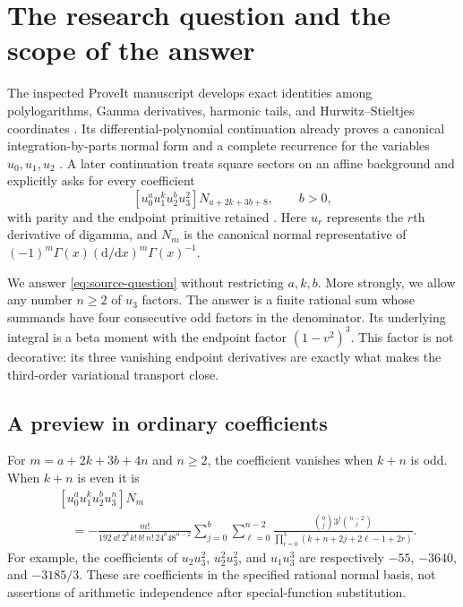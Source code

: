 \section{The research question and the scope of the answer}
\label{sec:scope}

The inspected ProveIt manuscript develops exact identities among
polylogarithms, Gamma derivatives, harmonic tails, and Hurwitz--Stieltjes
coordinates \cite{RepoMain}. Its differential-polynomial continuation
already proves a canonical integration-by-parts normal form and a complete
recurrence for the variables $u_0,u_1,u_2$ \cite{RepoQuadratic}. A later
continuation treats square sectors on an affine background and explicitly
asks for every coefficient
\begin{equation}\label{eq:source-question}
 [u_0^a u_1^k u_2^b u_3^2]N_{a+2k+3b+8},\qquad b>0,
\end{equation}
with parity and the endpoint primitive retained \cite[Question 1]{RepoQuestions}.
Here $u_r$ represents the $r$th derivative of digamma, and $N_m$ is the
canonical normal representative of
$(-1)^m\Gamma(x)(\mathrm d/\mathrm dx)^m\Gamma(x)^{-1}$.

We answer \eqref{eq:source-question} without restricting $a,k,b$. More
strongly, we allow any number $n\ge2$ of $u_3$ factors. The answer is a
finite rational sum whose summands have four consecutive odd factors in
the denominator. Its underlying integral is a beta moment with the
endpoint factor $(1-v^2)^3$. This factor is not decorative: its three
vanishing endpoint derivatives are exactly what makes the third-order
variational transport close.

\subsection{A preview in ordinary coefficients}
For $m=a+2k+3b+4n$ and $n\ge2$, the coefficient vanishes when $k+n$ is
odd. When $k+n$ is even it is
\begin{equation}\label{eq:preview}
\begin{split}
 &[u_0^a u_1^k u_2^b u_3^n]N_m\\
 &\quad=-\frac{m!}{192\,a!\,2^k k!\,b!\,n!\,24^b48^{n-2}}
 \sum_{j=0}^{b}\sum_{\ell=0}^{n-2}
 \frac{\binom bj3^j\binom{n-2}{\ell}}
 {\displaystyle\prod_{r=0}^{3}(k+n+2j+2\ell-1+2r)}.
\end{split}
\end{equation}
For example, the coefficients of $u_2u_3^2$, $u_2^2u_3^2$, and
$u_1u_3^3$ are respectively $-55$, $-3640$, and $-3185/3$. These are
coefficients in the specified rational normal basis, not assertions of
arithmetic independence after special-function substitution.

